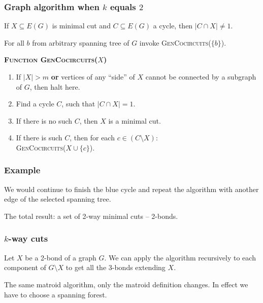 \documentclass[10pt]{beamer}
\begin{document}
\begin{frame}[fragile]
	\frametitle{Graph algorithm when $k$ equals $2$}

	If $X \subseteq E(G)$ is minimal cut and $C \subseteq E(G)$ a cycle,
    then $\lvert C \cap X \rvert \neq 1$.

    \bigskip

    For all $b$ from arbitrary spanning tree of $G$ invoke \textsc{GenCocircuits}($\{b\}$).

	\textbf{\textsc{Function GenCocircuits}($X$)}
	\begin{enumerate}
		\item If $\lvert X \rvert > m$ \textbf{or} vertices of any
            ``side'' of $X$ cannot be connected by a subgraph of $G$,
            then halt here.
		\item Find a cycle $C$, such that $\lvert C \cap X \rvert = 1$.
		\item If there is no such $C$, then $X$ is a minimal cut.
		\item If there is such $C$, then for each $c \in (C \setminus X)$: \\
			\hspace{12pt} \textsc{GenCocircuits}($X \cup \{c\}$).
	\end{enumerate}

\end{frame}



\begin{frame}
	\frametitle{Example}

    We would continue to finish the blue cycle and repeat the algorithm
    with another edge of the selected spanning tree.

    \bigskip

    The total result: a set of 2-way minimal cuts -- 2-bonds.
\end{frame}

\begin{frame}
	\frametitle{$k$-way cuts}

    Let $X$ be a 2-bond of a graph $G$. We can apply the algorithm
    recursively to each component of $G \setminus X$ to get all the
    3-bonds extending $X$.

    \bigskip

    The same matroid algorithm, only the matroid definition changes.
    In effect we have to choose a spanning forest.

\end{frame}
\end{document}
